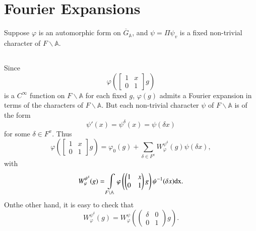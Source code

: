 \section{Fourier Expansions}\label{art1-sec10}

Suppose $\varphi$ is an automorphic form on $\overline{G}_{\mathbb{A}}$, and $\psi=\Pi \psi_{v}$ is a fixed non-trivial character of $F\backslash \mathbb{A}$.

\subsection{}\label{art1-sec10.1}
Since
$$
\varphi\left(\begin{bmatrix} 1 & x\\ 0 & 1\end{bmatrix}g\right)
$$
is a $C^{\infty}$ function on $F\backslash \mathbb{A}$ for each fixed $g$, $\varphi(g)$ admits a Fourier expansion in terms of the characters of $F\backslash \mathbb{A}$. But each non-trivial character $\psi$ of $F\backslash \mathbb{A}$ is of the form
\setcounter{equation}{0}
\begin{equation}
\psi'(x)=\psi^{\delta}(x)=\psi(\delta x)\label{art1-eq10.1.1}
\end{equation}
for some $\delta\in F^{x}$. Thus
\begin{equation}
\varphi \left(\begin{bmatrix} 1 & x\\ 0 & 1\end{bmatrix}g\right)=\varphi_{0}(g)+\sum\limits_{\delta\in F^{x}}W^{\psi^{\delta}}_{\varphi}(g)\psi (\delta x),\label{art1-eq10.1.2}
\end{equation}
with
\begin{equation}
W^{\psi^{\delta}}_{\varphi}(g)=\int\limits_{F\backslash \mathbb{A}}\varphi \left(\left(\begin{matrix} 1 & x\\ 0 & 1\end{matrix}\right)g\right)\psi^{-1}(\delta x)\mathrm{dx}.\label{art1-eq10.1.3}
\end{equation}
On\pageoriginale the other hand, it is easy to check that
\begin{equation}
W^{\psi^{\delta}}_{\varphi}(g)=W^{\psi}_{\varphi}\left(\left(\begin{matrix}\delta & 0\\ 0 & 1\end{matrix}\right)g\right).\label{art1-eq10.1.4}
\end{equation}
